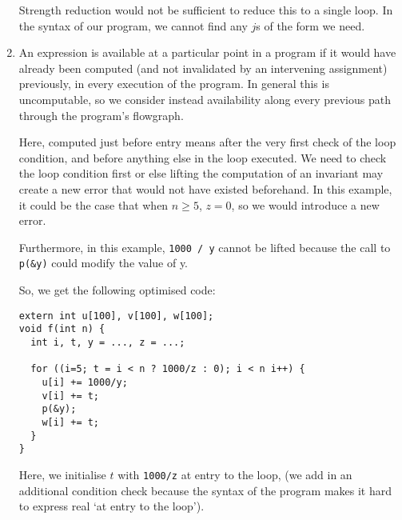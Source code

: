 \begin{enumerate}[label=(\alph*)]
Strength reduction would not be sufficient to reduce this to a single loop. In the syntax of our program, we cannot find any $j$s of the form we need.

\item

  An expression is available at a particular point in a program if it would have already been computed (and not invalidated by an intervening assignment) previously, in every execution of the program. In general this is uncomputable, so we consider instead availability along every previous path through the program's flowgraph.

  Here, computed just before entry means after the very first check of the loop condition, and before anything else in the loop executed. We need to check the loop condition first or else lifting the computation of an invariant may create a new error that would not have existed beforehand. In this example, it could be the case that when $n \geq 5$, $z=0$, so we would introduce a new error.

  Furthermore, in this example, \texttt{1000 / y} cannot be lifted because the call to \texttt{p(\&y)} could modify the value of y.
  
  So, we get the following optimised code:

\begin{verbatim}
extern int u[100], v[100], w[100];
void f(int n) {
  int i, t, y = ..., z = ...;

  for ((i=5; t = i < n ? 1000/z : 0); i < n i++) {
    u[i] += 1000/y;
    v[i] += t;
    p(&y);
    w[i] += t;
  }
}
\end{verbatim}

Here, we initialise $t$ with \texttt{1000/z} at entry to the loop, (we add in an additional condition check because the syntax of the program makes it hard to express real `at entry to the loop').

        
\end{enumerate}

